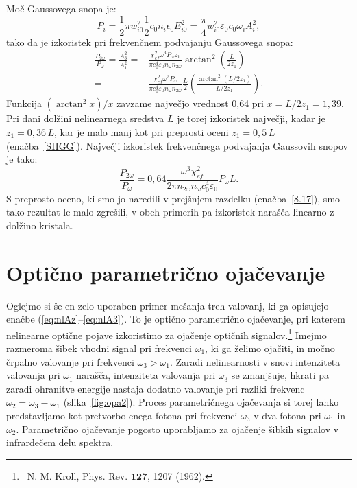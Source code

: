 Moč Gaussovega snopa je:
\begin{equation}
P_{i}=\frac{1}{2}\pi w_{i0}^{2} \frac{1}{2}c_0 n_i \epsilon_{0}E_{i0}^{2}=
\frac{\pi}{4}w_{i0}^{2}\varepsilon_0 c_0 \omega_{i} A_{i}^{2},
\label{8.26}
\end{equation}
tako da je izkoristek pri frekvenčnem podvajanju Gaussovega snopa:
\begin{align}
\frac{P_{2\omega}}{P_{\omega}}=\frac{A_3^2}{A_1^2}  = &
\frac{\chi_{ef}^2 \omega^3 P_\omega z_1}{\pi c_0^4 \varepsilon_0 n_\omega n_{2\omega}} 
\arctan^2 \left( \frac{L}{2z_1}\right) \nonumber \\
 = &\frac{\chi_{ef}^2 \omega^3 P_\omega}{\pi c_0^4 \varepsilon_0 n_\omega n_{2\omega}} \frac{L}{2}
\left(\frac {\arctan^2 \left( L/2z_1\right)}{L/2z_1}\right)\!\!.
\label{8.27}
\end{align}
Funkcija $(\arctan^{2}x)/x$ zavzame največjo vrednost 0,64 pri $x =L/2z_1=1,39$.
Pri dani dolžini nelinearnega sredstva $L$ je torej 
izkoristek največji, kadar je $z_{1}=0,36\,L$, kar je malo manj kot pri
preprosti oceni $z_{1}=0,5\,L$ (enačba~\ref{SHGG}). Največji izkoristek
frekvenčnega podvajanja Gaussovih snopov je tako:
\begin{equation}
\frac{P_{2\omega}}{P_{\omega}}
= 0,64 \frac{\omega^3 \chi_{ef}^2}{2\pi n_{2\omega} n_{\omega} c_0^4 \varepsilon_0 } P_\omega L.
\label{8.28}
\end{equation}
S preprosto oceno, ki smo jo naredili v prejšnjem razdelku (enačba~\ref{8.17}), smo tako 
rezultat le malo zgrešili, v obeh primerih pa izkoristek narašča linearno z dolžino kristala.

\section{Optično parametrično ojačevanje}

Oglejmo si še en zelo uporaben primer mešanja treh valovanj, 
ki ga opisujejo enačbe (\ref{eq:nlAz}--\ref{eq:nlA3}). To je
optično parametrično ojačevanje, pri katerem nelinearne optične pojave
izkoristimo za ojačenje optičnih signalov.\footnote{~N. M. Kroll, Phys. Rev. $\mathbf{127}$, 1207 (1962).}
Imejmo razmeroma šibek vhodni
signal pri frekvenci $\omega_{1}$, ki ga želimo ojačiti, in močno črpalno valovanje
pri frekvenci $\omega_{3}>\omega_{1}$. Zaradi nelinearnosti v snovi  
intenziteta valovanja pri $\omega_{1}$ narašča, 
intenziteta valovanja pri $\omega_{3}$ se zmanjšuje, hkrati pa zaradi
ohranitve energije nastaja dodatno valovanje pri razliki frekvenc
$\omega_{2}=\omega_{3}-\omega_{1}$ (slika~\ref{fig:opa2}). Proces parametričnega ojačevanja 
si torej lahko predstavljamo kot pretvorbo enega fotona pri frekvenci 
$\omega_{3}$ v dva fotona pri $\omega_{1}$ in $\omega_{2}$.
Parametrično ojačevanje pogosto uporabljamo za ojačenje šibkih signalov 
v infrardečem delu spektra.

